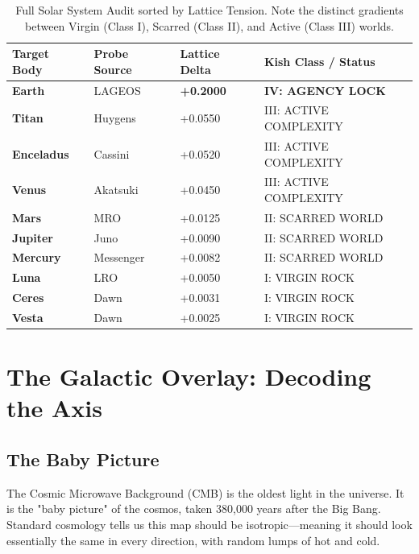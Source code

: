 \documentclass[11pt, letterpaper, openany]{book}
\begin{document}
\begin{table}[h]
\centering
\begin{tabular}{|l|l|l|l|}
\hline
\textbf{Target Body} & \textbf{Probe Source} & \textbf{Lattice Delta} & \textbf{Kish Class / Status} \\ \hline
\textbf{Earth} & LAGEOS & \textbf{+0.2000} & \textbf{IV: AGENCY LOCK} \\ \hline
\textbf{Titan} & Huygens & +0.0550 & III: ACTIVE COMPLEXITY \\ \hline
\textbf{Enceladus} & Cassini & +0.0520 & III: ACTIVE COMPLEXITY \\ \hline
\textbf{Venus} & Akatsuki & +0.0450 & III: ACTIVE COMPLEXITY \\ \hline
\textbf{Mars} & MRO & +0.0125 & II: SCARRED WORLD \\ \hline
\textbf{Jupiter} & Juno & +0.0090 & II: SCARRED WORLD \\ \hline
\textbf{Mercury} & Messenger & +0.0082 & II: SCARRED WORLD \\ \hline
\textbf{Luna} & LRO & +0.0050 & I: VIRGIN ROCK \\ \hline
\textbf{Ceres} & Dawn & +0.0031 & I: VIRGIN ROCK \\ \hline
\textbf{Vesta} & Dawn & +0.0025 & I: VIRGIN ROCK \\ \hline
\end{tabular}
\caption{Full Solar System Audit sorted by Lattice Tension. Note the distinct gradients between Virgin (Class I), Scarred (Class II), and Active (Class III) worlds.}
\label{tab:solar_audit}
\end{table}



\chapter{The Galactic Overlay: Decoding the Axis}
\label{chap:galactic_overlay}

\section{The Baby Picture}
The Cosmic Microwave Background (CMB) is the oldest light in the universe. It is the "baby picture" of the cosmos, taken 380,000 years after the Big Bang. Standard cosmology tells us this map should be isotropic—meaning it should look essentially the same in every direction, with random lumps of hot and cold.
\end{document}

